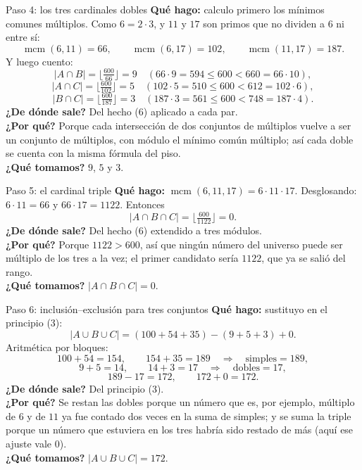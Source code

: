\documentclass[11pt]{article}
\begin{document}
\begin{sol}
\begin{paso}{Paso 4: los tres cardinales dobles}
\textbf{Qu\'e hago:} calculo primero los m\'inimos comunes m\'ultiplos. Como $6=2\cdot 3$, y $11$ y $17$ son primos que no dividen a $6$ ni entre s\'i:
\[
\operatorname{mcm}(6,11)=66,\qquad \operatorname{mcm}(6,17)=102,\qquad \operatorname{mcm}(11,17)=187 .
\]
Y luego cuento:
\[
|A\cap B| = \Big\lfloor \tfrac{600}{66}\Big\rfloor = 9 \quad (66\cdot 9 = 594 \le 600 < 660 = 66\cdot 10),
\]
\[
|A\cap C| = \Big\lfloor \tfrac{600}{102}\Big\rfloor = 5 \quad (102\cdot 5 = 510 \le 600 < 612 = 102\cdot 6),
\]
\[
|B\cap C| = \Big\lfloor \tfrac{600}{187}\Big\rfloor = 3 \quad (187\cdot 3 = 561 \le 600 < 748 = 187\cdot 4).
\]
\textbf{¿De d\'onde sale?} Del hecho (6) aplicado a cada par.\\
\textbf{¿Por qu\'e?} Porque cada intersecci\'on de dos conjuntos de m\'ultiplos vuelve a ser un conjunto de m\'ultiplos, con m\'odulo el m\'inimo com\'un m\'ultiplo; as\'i cada doble se cuenta con la misma f\'ormula del piso.\\
\textbf{¿Qu\'e tomamos?} $9$, $5$ y $3$.
\end{paso}

\begin{paso}{Paso 5: el cardinal triple}
\textbf{Qu\'e hago:} $\operatorname{mcm}(6,11,17) = 6\cdot 11\cdot 17$. Desglosando: $6\cdot 11 = 66$ y $66\cdot 17 = 1122$. Entonces
\[
|A\cap B\cap C| = \Big\lfloor \tfrac{600}{1122}\Big\rfloor = 0 .
\]
\textbf{¿De d\'onde sale?} Del hecho (6) extendido a tres m\'odulos.\\
\textbf{¿Por qu\'e?} Porque $1122 > 600$, as\'i que ning\'un n\'umero del universo puede ser m\'ultiplo de los tres a la vez; el primer candidato ser\'ia $1122$, que ya se sali\'o del rango.\\
\textbf{¿Qu\'e tomamos?} $|A\cap B\cap C| = 0$.
\end{paso}

\begin{paso}{Paso 6: inclusi\'on--exclusi\'on para tres conjuntos}
\textbf{Qu\'e hago:} sustituyo en el principio (3):
\[
|A\cup B\cup C| = (100+54+35) - (9+5+3) + 0 .
\]
Aritm\'etica por bloques:
\[
100+54 = 154,\qquad 154+35 = 189 \quad\Longrightarrow\quad \text{simples} = 189,
\]
\[
9+5 = 14,\qquad 14+3 = 17 \quad\Longrightarrow\quad \text{dobles} = 17,
\]
\[
189 - 17 = 172,\qquad 172 + 0 = 172 .
\]
\textbf{¿De d\'onde sale?} Del principio (3).\\
\textbf{¿Por qu\'e?} Se restan las dobles porque un n\'umero que es, por ejemplo, m\'ultiplo de $6$ y de $11$ ya fue contado dos veces en la suma de simples; y se suma la triple porque un n\'umero que estuviera en los tres habr\'ia sido restado de m\'as (aqu\'i ese ajuste vale $0$).\\
\textbf{¿Qu\'e tomamos?} $|A\cup B\cup C| = 172$.
\end{paso}


\end{sol}
\end{document}
